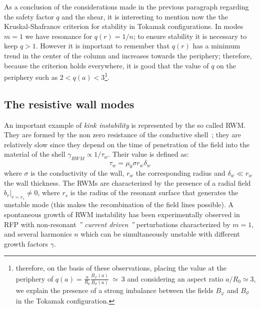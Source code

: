 As a conclusion of the considerations made in the previous paragraph regarding the safety factor $ q $ and the shear, it is interesting to mention now the the Kruskal-Shafranov criterion for stability in Tokamak configurations. In modes $ m = 1 $ we have resonance for $q(r)=1/n$; to ensure stability it is necessary to keep $ q>1 $. However it is important to remember that $ q (r) $ has a minimum trend in the center of the column and increases towards the periphery; therefore, because the criterion holds everywhere, it is good that the value of $ q $ on the periphery such as $ 2<q(a)<3 $\footnote{therefore, on the basis of these observations, placing the value at the periphery of $q(a)=\frac{a}{R_0}\frac{B_\varphi(a)}{B_\vartheta(a)}~\simeq~3$ and considering an aspect ratio $a/R_0 \simeq 3$, we explain the presence of a strong imbalance between the fields $B_\varphi$ and $B_\vartheta$ in the Tokamak configuration.}.




\subsection{The resistive wall modes}

An important example of \textit{kink instability} is represented by the so called \ac{RWM}. They are formed by the non zero resistance of the conductive shell~\cite{144132475}; they are relatively slow since they depend on the time of penetration of the field into the material of the shell $\gamma_{RWM} \propto 1/\tau_w$. Their value is defined as:
%
\begin{equation}
 \tau_w = \mu_0 \sigma r_w \delta_w
\end{equation}
%
where $\sigma$ is the conductivity of the wall, $ r_w $ the corresponding radius and $\delta_w \ll r_w$ the wall thickness. The \acs{RWM}s are characterized by the presence of a radial field $b_r|_{r=r_s} \neq 0$, where $ r_s $ is the radius of the resonant surface that generates the unstable mode (this makes the recombination of the field lines possible).
%
A spontaneous growth of \acs{RWM} instability has been experimentally observed in \acs{RFP} with non-resonant \emph{'' current driven ''} perturbations characterized by $ m = 1 $, and several harmonics $ n $ which can be simultaneously unstable with different growth factors $\gamma$\cite{pizz46}\cite{pizz47}\cite{gregoratto}.


